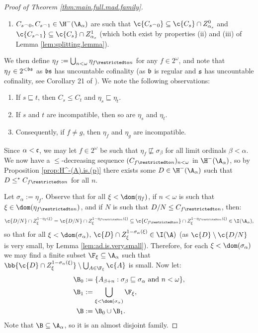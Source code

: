 \documentclass[11pt,reqno]{amsart}
\begin{document}
\begin{proof}[Proof of Theorem \ref{thm:main.full.mad.family}]
\begin{enumerate}
        \item $C_{s^\frown0},C_{s^\frown1} \in \H^-(\A_\alpha)$ are such that $\c{C_{s^\frown0}} \subseteq \c{C_s} \cap Z_{\alpha_s}^0$ and $\c{C_{s^\frown1}} \subseteq \c{C_s} \cap Z_{\alpha_s}^1$ (which both exist by properties (ii) and (iii) of Lemma \ref{lem:splitting.lemma}).
    \end{enumerate}
    We then define $\eta_f := \bigcup_{n<\omega} \eta_{f\restrictedto n}$ for any $f \in 2^\omega$, and note that $\eta_f \in 2^{<\frak{bs}}$ as $\frak{bs}$ has uncountable cofinality (as $\frak{b}$ is regular and $\frak{s}$ has uncountable cofinality, see Corollary 21 of \cite{G21}). We note the following observations:
    \begin{enumerate}
        \item If $s \sqsubseteq t$, then $C_s \leq C_t$ and $\eta_s \sqsubseteq \eta_t$.

        \item If $s$ and $t$ are incompatible, then so are $\eta_s$ and $\eta_t$.

        \item Consequently, if $f \neq g$, then $\eta_f$ and $\eta_g$ are incompatible.
    \end{enumerate}
    Since $\alpha < \frak{c}$, we may let $f \in 2^\omega$ be such that $\eta_f \not\sqsubseteq \sigma_\beta$ for all limit ordinals $\beta < \alpha$. We now have a $\leq$-decreasing sequence $(C_{f\restrictedto n})_{n<\omega}$ in $\H^-(\A_\alpha)$, so by Proposition \ref{prop:H^-(A).is.(p)} there exists some $D \in \H^-(\A_\alpha)$ such that $D \leq^* C_{f\restrictedto n}$ for all $n$.

    Let $\sigma_{\alpha} := \eta_f$. Observe that for all $\xi < \dom(\eta_f)$, if $n < \omega$ is such that $\xi \in \dom(\eta_{f\restrictedto n})$, and if $N$ is such that $D/N \leq C_{f\restrictedto n}$, then:
    \begin{align*}
        \c{D/N} \cap Z_\xi^{1-\eta_f(\xi)} = \c{D/N} \cap Z_\xi^{1-\eta_{f\restrictedto n}(\xi)} \subseteq \c{C_{f\restrictedto n}} \cap Z_\xi^{1-\eta_{f\restrictedto n}(\xi)} \in \I(\A_\alpha),
    \end{align*}
    so that for all $\xi < \dom(\sigma_{\alpha})$, $\c{D} \cap Z_\xi^{1-\sigma_\alpha(\xi)} \in \I(\A)$ (as $\c{D} \setminus \c{D/N}$ is very small, by Lemma \ref{lem:ad.is.very.small}). Therefore, for each $\xi < \dom(\sigma_\alpha)$ we may find a finite subset $\F_\xi \subseteq \A_\alpha$ such that $\bb{\c{D} \cap Z_\xi^{1-\sigma_\alpha(\xi)}} \setminus \bigcup_{A \in \F_\xi} \c{A}$ is small. Now let:
    \begin{align*}
        \B_0 &:= \{A_{\beta+n} : \sigma_\beta \sqsubseteq \sigma_\alpha \text{ and } n < \omega\}, \\
        \B_1 &:= \bigcup_{\xi < \dom(\sigma_\alpha)} \F_\xi, \\
        \B &:= \B_0 \cup \B_1.
    \end{align*}
    Note that $\B \subseteq \A_\alpha$, so it is an almost disjoint family.


\end{proof}
\end{document}
